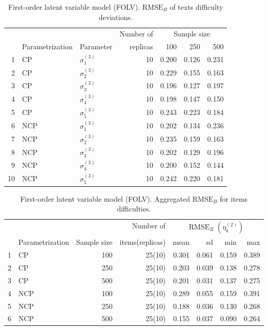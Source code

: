 \begin{table}[H]
	\centering
	\begin{tabular}{rllrrrr}
		\hline
		\multicolumn{3}{c}{ } & Number of &\multicolumn{3}{c}{ Sample size } \\ 
		\cmidrule(rl){5-7}
		& Parametrization & Parameter & replicas & 100 & 250 & 500 \\  
		\hline\hline
		1 & CP & $\sigma^{(3)}_{1}$ &   10 & 0.200 & 0.126 & 0.231 \\ 
		2 & CP & $\sigma^{(3)}_{2}$ &   10 & 0.229 & 0.155 & 0.163 \\ 
		3 & CP & $\sigma^{(3)}_{3}$ &   10 & 0.196 & 0.127 & 0.197 \\ 
		4 & CP & $\sigma^{(3)}_{4}$ &   10 & 0.198 & 0.147 & 0.150 \\ 
		5 & CP & $\sigma^{(3)}_{5}$ &   10 & 0.243 & 0.223 & 0.184 \\ 
		\hline
		6 & NCP & $\sigma^{(3)}_{1}$ &   10 & 0.202 & 0.134 & 0.236 \\ 
		7 & NCP & $\sigma^{(3)}_{2}$ &   10 & 0.235 & 0.159 & 0.163 \\ 
		8 & NCP & $\sigma^{(3)}_{3}$ &   10 & 0.202 & 0.129 & 0.196 \\ 
		9 & NCP & $\sigma^{(3)}_{4}$ &   10 & 0.200 & 0.152 & 0.144 \\ 
		10 & NCP & $\sigma^{(3)}_{5}$ &   10 & 0.242 & 0.220 & 0.181 \\ 
		\hline
	\end{tabular}
	\caption[First-order latent variable model (FOLV). $\text{RMSE}_{B}$ of texts difficulty deviations.]%
	{First-order latent variable model (FOLV). $\text{RMSE}_{B}$ of texts difficulty deviations.}
	\label{tab:FOLV_RMSE_texts_dev}
\end{table}
%
\begin{table}[ht]
	\centering
	\begin{tabular}{rlrrrrrr}
		\hline
		\multicolumn{3}{c}{ } & Number of &\multicolumn{4}{c}{ $\text{RMSE}_{B}$ $( \eta^{(2)}_{k} )$ } \\ 
		\cmidrule(rl){5-8}
		& Parametrization & Sample size & items(replicas) & mean & sd & min & max \\  
		\hline\hline
		1 & CP &  100 & 25(10) & 0.301 & 0.061 & 0.159 & 0.389 \\ 
		2 & CP &  250 & 25(10) & 0.203 & 0.039 & 0.138 & 0.278 \\ 
		3 & CP &  500 & 25(10) & 0.201 & 0.031 & 0.137 & 0.275 \\ 
		\hline
		4 & NCP &  100 & 25(10) & 0.289 & 0.055 & 0.159 & 0.391 \\ 
		5 & NCP &  250 & 25(10) & 0.188 & 0.036 & 0.130 & 0.268 \\ 
		6 & NCP &  500 & 25(10) & 0.155 & 0.037 & 0.090 & 0.264 \\ 
		\hline
	\end{tabular}
	\caption[First-order latent variable model (FOLV). Aggregated $\text{RMSE}_{B}$ for items difficulties.]%
	{First-order latent variable model (FOLV). Aggregated $\text{RMSE}_{B}$ for items difficulties.}
	\label{tab:FOLV_RMSE_items}
\end{table}
